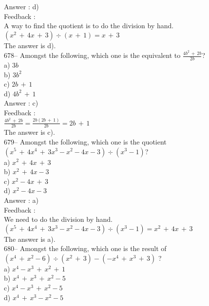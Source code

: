 \documentclass[letterpaper, 12pt]{article}
\begin{document}
Answer : d)\\

Feedback : \\
A way to find the quotient is to do the division by hand.\\
$\left( x^{2}\,+\,4x\,+\,3\right) \div \left( x\,+\,1\right)= x\,+\,3$\\
The answer is d).\\

678-- Amongst the following, which one is the equivalent to
$\frac{4b^{2}\,+\,2b}{2b}$?\\
a) $3b$\\
b) $3b^{2}$\\
c) $2b\,+\,1$\\
d) $4b^{2}\,+\,1$\\

Answer : c)\\

Feedback : \\[2mm]
$\frac{4b^{2}\,+\,2b}{2b}=\frac{2b\left(2b\,+\,1 \right)
}{2b}=2b\,+\,1$\\[2mm]
The answer is c).\\

679-- Amongst the following, which one is the quotient $\left(
x^{5}\,+\,4x^{4}\,+\,3x^{3}-x^{2}-4x-3\right) \div\left( x^{3}-1\right) $?\\
a) $x^{2}\,+\,4x\,+\,3$\\
b) $x^{2}\,+\,4x-3$\\
c) $x^{2}-4x\,+\,3$\\
d) $x^{2}-4x-3$\\

Answer : a)\\

Feedback :\\
We need to do the division by hand.  \\
$\left( x^{5}\,+\,4x^{4}\,+\,3x^{3}-x^{2}-4x-3\right) \div\left(
x^{3}-1\right)=x^{2}\,+\,4x\,+\,3$\\
The answer is a).\\

680-- Amongst the following, which one is the result of $\left(
x^{4}\,+\,x^{2}-6\right) \div\left( x^{2}\,+\,3\right) -\left(
-x^{4}\,+\,x^{3}\,+\,3\right)$ ?\\
a) $x^{4}-x^{3}\,+\,x^{2}\,+\,1$\\
b) $x^{4}\,+\,x^{3}\,+\,x^{2}-5$\\
c) $x^{4}-x^{3}\,+\,x^{2}-5$\\
d) $x^{4}\,+\,x^{3}-x^{2}-5$\\
\end{document}
